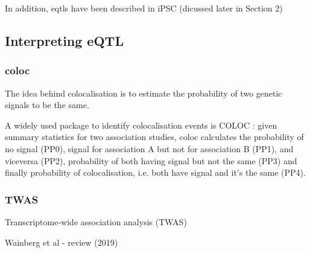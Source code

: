 


In addition, \glspl{eqtl} have been described in iPSC (dicussed later in Section 2)

\subsection{Interpreting eQTL}

\subsubsection{coloc}
The idea behind colocalisation is to estimate the probability of two genetic signals to be the same.

\cite{wallace2012statistical}

A widely used package to identify colocalisation events is COLOC \cite{giambartolomei2014bayesian}: given summary statistics for two association studies, coloc calculates the probability of no signal (PP0), signal for association A but not for association B (PP1), and viceversa (PP2), probability of both having signal but not the same (PP3) and finally probability of colocalisation, i.e. both have signal and it's the same (PP4).

\subsubsection{TWAS}

Transcriptome-wide association analysis (TWAS)

Wainberg et al - review (2019) \cite{wainberg2019opportunities}





